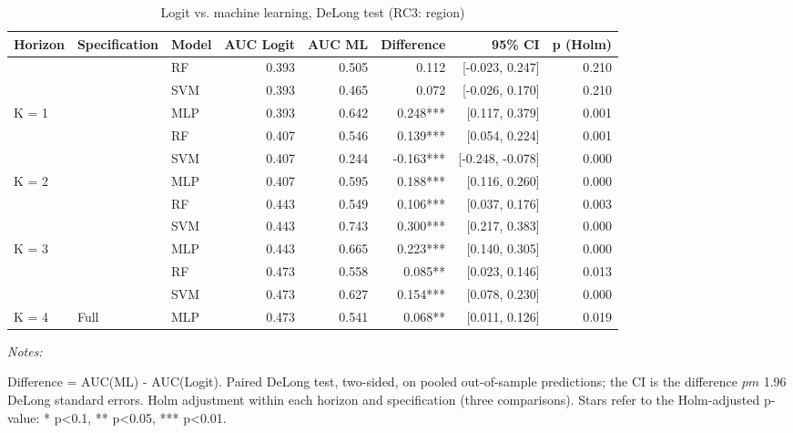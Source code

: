 \begin{table}

\caption{\label{tab:delong_rc3}Logit vs. machine learning, DeLong test (RC3: region)}
\centering
\begin{threeparttable}
\begin{tabular}[t]{lllrrrrr}
\toprule
Horizon & Specification & Model & AUC Logit & AUC ML & Difference & 95\% CI & p (Holm)\\
\midrule
 &  & RF & 0.393 & 0.505 & 0.112 & {}[-0.023, 0.247] & 0.210\\

 &  & SVM & 0.393 & 0.465 & 0.072 & {}[-0.026, 0.170] & 0.210\\

\multirow[t]{-2}{*}[\normalbaselineskip]{\raggedright\arraybackslash K = 1} &  & MLP & 0.393 & 0.642 & 0.248*** & {}[0.117, 0.379] & 0.001\\

 &  & RF & 0.407 & 0.546 & 0.139*** & {}[0.054, 0.224] & 0.001\\

 &  & SVM & 0.407 & 0.244 & -0.163*** & {}[-0.248, -0.078] & 0.000\\

\multirow[t]{-2}{*}[\normalbaselineskip]{\raggedright\arraybackslash K = 2} &  & MLP & 0.407 & 0.595 & 0.188*** & {}[0.116, 0.260] & 0.000\\

 &  & RF & 0.443 & 0.549 & 0.106*** & {}[0.037, 0.176] & 0.003\\

 &  & SVM & 0.443 & 0.743 & 0.300*** & {}[0.217, 0.383] & 0.000\\

\multirow[t]{-2}{*}[\normalbaselineskip]{\raggedright\arraybackslash K = 3} &  & MLP & 0.443 & 0.665 & 0.223*** & {}[0.140, 0.305] & 0.000\\

 &  & RF & 0.473 & 0.558 & 0.085** & {}[0.023, 0.146] & 0.013\\

 &  & SVM & 0.473 & 0.627 & 0.154*** & {}[0.078, 0.230] & 0.000\\

\multirow[t]{-2}{*}[\normalbaselineskip]{\raggedright\arraybackslash K = 4} & \multirow[t]{-11}{*}[\normalbaselineskip]{\raggedright\arraybackslash Full} & MLP & 0.473 & 0.541 & 0.068** & {}[0.011, 0.126] & 0.019\\
\bottomrule
\end{tabular}
\begin{tablenotes}
\item \textit{Notes: } 
\item Difference = AUC(ML) - AUC(Logit). Paired DeLong test, two-sided, on pooled out-of-sample predictions; the CI is the difference $pm$ 1.96 DeLong standard errors. Holm adjustment within each horizon and specification (three comparisons). Stars refer to the Holm-adjusted p-value: * p<0.1, ** p<0.05, *** p<0.01.
\end{tablenotes}
\end{threeparttable}
\end{table}
